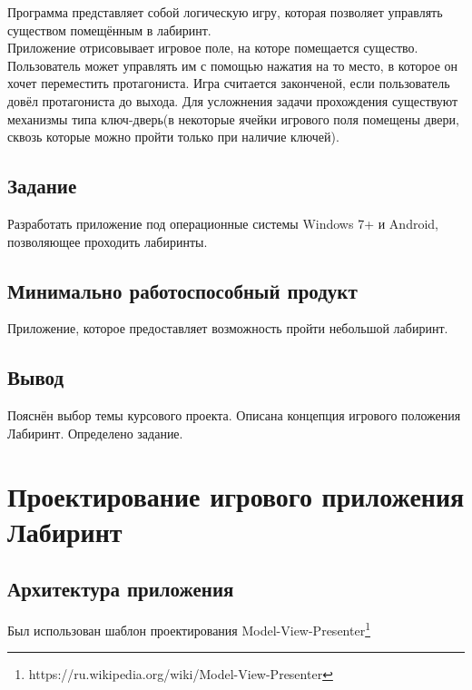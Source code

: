 Программа представляет собой логическую игру, которая позволяет управлять существом помещённым в лабиринт.\\

Приложение отрисовывает игровое поле, на которе помещается существо. Пользователь может управлять им с помощью нажатия на то место, в которое он хочет переместить протагониста. Игра считается законченой, если пользователь довёл протагониста до выхода.
Для усложнения задачи прохождения существуют механизмы типа ключ-дверь(в некоторые ячейки игрового поля помещены двери, сквозь которые можно пройти только при наличие ключей).\\

\subsection{Задание}

Разработать приложение под операционные системы Windows 7+ и Android, позволяющее проходить лабиринты. 

\subsection{Минимально работоспособный продукт}

Приложение, которое предоставляет возможность пройти небольшой лабиринт.

\subsection{Вывод}

Пояснён выбор темы курсового проекта. Описана концепция игрового положения Лабиринт. Определено задание.


\section{Проектирование игрового приложения Лабиринт}

\subsection{Архитектура приложения}

Был использован шаблон проектирования Model-View-Presenter\footnote{https://ru.wikipedia.org/wiki/Model-View-Presenter}\\

